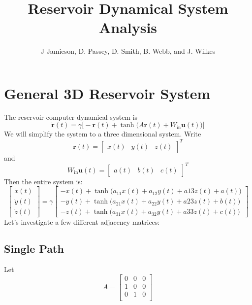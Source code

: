 \documentclass[12pt]{article}
\begin{document}
\title{\normalsize\bf%
Reservoir Dynamical System Analysis}
\vspace{-0.5in}
\author{\vspace{-0.25in} J Jamieson, D. Passey, D. Smith,  B. Webb, and J. Wilkes\\
}

\date{\vspace{-5ex}} %

\maketitle

\thispagestyle{empty}
\pagestyle{empty}


\normalsize \vspace{-.25in}
\section{General 3D Reservoir System}
The reservoir computer dynamical system is
\[
\mathbf{\dot{r}}(t) = \gamma \big[ -\mathbf{r}(t) + 
\tanh  \big(A\mathbf{r}(t) +  W_\text{in} \mathbf{u}(t)\big) \big]
\]
We will simplify the system to a three dimensional system. Write
\[\mathbf{r}(t) = \begin{bmatrix} x(t) & y(t)  & z(t) \end{bmatrix}^T
\] and
\[ W_\text{in} \mathbf{u}(t) = \begin{bmatrix} a(t) & b(t) & c(t) \end{bmatrix}^T
\]
Then the entire system is:
\[
\begin{bmatrix} \dot{x}(t) \\ \dot{y}(t) \\ \dot{z}(t) \end{bmatrix}
=
\gamma \begin{bmatrix}
-x(t) + \tanh\Big(a_{11} x(t) + a_{12} y(t) + a{13} z(t) + a(t) \Big) \\
-y(t) + \tanh\Big(a_{21} x(t) + a_{22} y(t) + a{23} z(t) + b(t) \Big)  \\
-z(t) + \tanh\Big(a_{31} x(t) + a_{32} y(t) + a{33} z(t) + c(t) \Big)
\end{bmatrix}
\]
 Let's investigate a few different adjacency matrices:
 \subsection{Single Path}
 Let
 \[
 A = 
 \begin{bmatrix} 
 0 & 0 & 0 \\
 1 & 0 & 0 \\
 0 & 1 & 0 \\
 \end{bmatrix}
 \]
 
\end{document}
